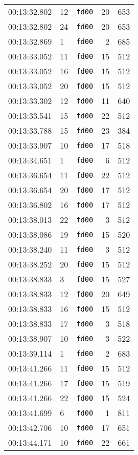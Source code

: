\documentclass{article}
\begin{document}
\begin{longtable}{lllrr}
00:13:32.802 & 12 & \texttt{fd00} & 20 & 653 \\
00:13:32.802 & 24 & \texttt{fd00} & 20 & 653 \\
00:13:32.869 & 1 & \texttt{fd00} & 2 & 685 \\
00:13:33.052 & 11 & \texttt{fd00} & 15 & 512 \\
00:13:33.052 & 16 & \texttt{fd00} & 15 & 512 \\
00:13:33.052 & 20 & \texttt{fd00} & 15 & 512 \\
00:13:33.302 & 12 & \texttt{fd00} & 11 & 640 \\
00:13:33.541 & 15 & \texttt{fd00} & 22 & 512 \\
00:13:33.788 & 15 & \texttt{fd00} & 23 & 384 \\
00:13:33.907 & 10 & \texttt{fd00} & 17 & 518 \\
00:13:34.651 & 1 & \texttt{fd00} & 6 & 512 \\
00:13:36.654 & 11 & \texttt{fd00} & 22 & 512 \\
00:13:36.654 & 20 & \texttt{fd00} & 17 & 512 \\
00:13:36.802 & 16 & \texttt{fd00} & 17 & 512 \\
00:13:38.013 & 22 & \texttt{fd00} & 3 & 512 \\
00:13:38.086 & 19 & \texttt{fd00} & 15 & 520 \\
00:13:38.240 & 11 & \texttt{fd00} & 3 & 512 \\
00:13:38.252 & 20 & \texttt{fd00} & 15 & 512 \\
00:13:38.833 & 3 & \texttt{fd00} & 15 & 527 \\
00:13:38.833 & 12 & \texttt{fd00} & 20 & 649 \\
00:13:38.833 & 16 & \texttt{fd00} & 15 & 512 \\
00:13:38.833 & 17 & \texttt{fd00} & 3 & 518 \\
00:13:38.907 & 10 & \texttt{fd00} & 3 & 522 \\
00:13:39.114 & 1 & \texttt{fd00} & 2 & 683 \\
00:13:41.266 & 11 & \texttt{fd00} & 15 & 512 \\
00:13:41.266 & 17 & \texttt{fd00} & 15 & 519 \\
00:13:41.266 & 22 & \texttt{fd00} & 15 & 524 \\
00:13:41.699 & 6 & \texttt{fd00} & 1 & 811 \\
00:13:42.706 & 10 & \texttt{fd00} & 17 & 651 \\
00:13:44.171 & 10 & \texttt{fd00} & 22 & 661 \\

\end{longtable}
\end{document}

